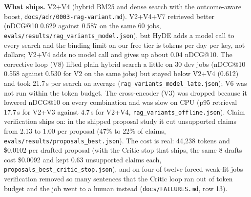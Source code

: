 \documentclass[10pt,a4paper]{article}
\newcommand{\file}[1]{\texttt{\small #1}}
\begin{document}
\textbf{What ships.} V2+V4 (hybrid BM25 and dense search with the outcome-aware boost, \file{docs/adr/0003-rag-variant.md}).
V2+V4+V7 retrieved better (nDCG@10 0.629 against 0.587 on the same 60 jobs, \file{evals/results/rag\_variants\_model.json}),
but HyDE adds a model call to every search and the binding limit on our free tier is tokens per day per key, not
dollars; V2+V4 adds no model call and gives up about 0.04 nDCG@10. The corrective loop (V8) lifted plain hybrid search
a little on 30 dev jobs (nDCG@10 0.558 against 0.530 for V2 on the same jobs) but stayed below V2+V4 (0.612) and
took 21.7\,s per search on average (\file{rag\_variants\_model\_late.json}); V6 was not run within the token budget. The cross-encoder (V3) was dropped because it lowered nDCG@10 on every
combination and was slow on CPU (p95 retrieval 17.7\,s for V2+V3 against 4.7\,s for V2+V4,
\file{rag\_variants\_offline.json}). Claim verification ships on: in the shipped
proposal study it cut unsupported claims from 2.13 to 1.00 per proposal (47\% to 22\% of claims,
\file{evals/results/proposals\_best.json}). The cost is real: 44,238 tokens and \$0.0102 per drafted proposal (with the
Critic stop that ships, the same 8 drafts cost \$0.0092 and kept 0.63 unsupported claims each,
\file{proposals\_best\_critic\_stop.json}), and on four
of twelve forced weak-fit jobs verification removed so many sentences that the Critic loop ran out of token budget and
the job went to a human instead (\file{docs/FAILURES.md}, row 13).

\end{document}
